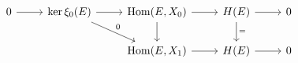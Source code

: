 \documentclass[12pt]{standalone}
\begin{document}
        $$

\begin{tikzcd}
0 \ar[r] & \ker \xi_0(E) \ar[r] \ar[rd,"0"] & 
\operatorname{Hom}(E,X_0) \ar[r] \ar[d] & H(E)
\ar[d,"="] \ar[r] & 0 \\
& & \operatorname{Hom}(E,X_1) \ar[r] & H(E) \ar[r] & 0 
\end{tikzcd}
        $$
        
\end{document}
